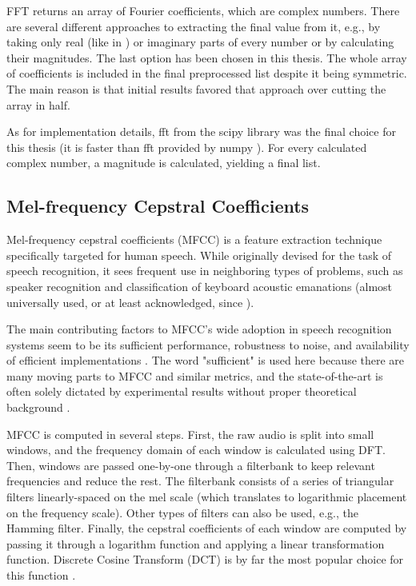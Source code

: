 \documentclass[../main.tex]{subfiles}
\begin{document}
FFT returns an array of Fourier coefficients, which are complex numbers. There are several different approaches to extracting the final value from it, e.g., by taking only real (like in \cite{dict2006}) or imaginary parts of every number or by calculating their magnitudes. The last option has been chosen in this thesis. The whole array of coefficients is included in the final preprocessed list despite it being symmetric. The main reason is that initial results favored that approach over cutting the array in half. 

As for implementation details, fft from the scipy library \cite{scipy} was the final choice for this thesis (it is faster than fft provided by numpy \cite{numpy}). For every calculated complex number, a magnitude is calculated, yielding a final list. 

\subsection{Mel-frequency Cepstral Coefficients}
\label{sec:dataset_mfcc}
Mel-frequency cepstral coefficients (MFCC) is a feature extraction technique specifically targeted for human speech. While originally devised for the task of speech recognition, it sees frequent use in neighboring types of problems, such as speaker recognition \cite{kinnunen2003spectral} and classification of keyboard acoustic emanations (almost universally used, or at least acknowledged, since \cite{revisited2005}).


The main contributing factors to MFCC's wide adoption in speech recognition systems seem to be
its sufficient performance, robustness to noise, and availability of efficient implementations \cite{mfccbook2012}. 
The word "sufficient" is used here because there are many moving parts to MFCC and similar metrics,
and the state-of-the-art is often solely dictated by experimental results without proper theoretical
background \cite{kinnunen2003spectral}.

MFCC is computed in several steps. First, the raw audio is split into small windows, and the frequency
domain of each window is calculated using DFT. Then, windows are passed one-by-one through a filterbank
to keep relevant frequencies and reduce the rest. The filterbank consists of a series of triangular
filters linearly-spaced on the mel scale (which translates to logarithmic placement on the frequency scale).
Other types of filters can also be used, e.g., the Hamming filter.
Finally, the cepstral coefficients of each window are computed by passing it through a logarithm function and
applying a linear transformation function. Discrete Cosine Transform (DCT) is by far the most popular
choice for this function \cite{mfccbook2012}.
\end{document}
